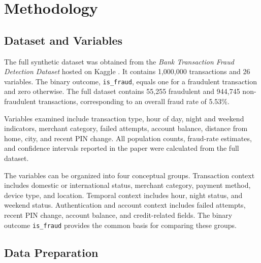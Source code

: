 \documentclass[conference,final,]{IEEEtran}
\begin{document}
\section{Methodology}\label{methodology}

\subsection{Dataset and Variables}\label{dataset-and-variables}

The full synthetic dataset was obtained from the \emph{Bank Transaction
Fraud Detection Dataset} hosted on Kaggle \citep{kaggleBankFraud}. It
contains 1,000,000 transactions and 26 variables. The binary outcome,
\texttt{is\_fraud}, equals one for a fraudulent transaction and zero
otherwise. The full dataset contains 55,255 fraudulent and 944,745
non-fraudulent transactions, corresponding to an overall fraud rate of
5.53\%.

\begin{table}[!h]
\centering
\caption{\label{tab:table-dataset-summary}Full transaction dataset summary}
\centering
{}
\end{table}

Variables examined include transaction type, hour of day, night and
weekend indicators, merchant category, failed attempts, account balance,
distance from home, city, and recent PIN change. All population counts,
fraud-rate estimates, and confidence intervals reported in the paper
were calculated from the full dataset.

The variables can be organized into four conceptual groups. Transaction
context includes domestic or international status, merchant category,
payment method, device type, and location. Temporal context includes
hour, night status, and weekend status. Authentication and account
context includes failed attempts, recent PIN change, account balance,
and credit-related fields. The binary outcome \texttt{is\_fraud}
provides the common basis for comparing these groups.

\subsection{Data Preparation}\label{data-preparation}
\end{document}
